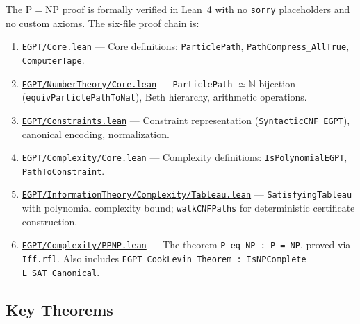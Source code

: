 \documentclass[11pt,a4paper]{article}
\begin{document}
The $\mathrm{P} = \mathrm{NP}$ proof is formally verified in Lean~4 with no \texttt{sorry} placeholders and no custom axioms. The six-file proof chain is:

\begin{enumerate}
    \item \href{https://eabadir.github.io/EGPT/Lean/EGPT/Core.lean}{\texttt{EGPT/Core.lean}} --- Core definitions: \texttt{ParticlePath}, \texttt{PathCompress\_AllTrue}, \texttt{ComputerTape}.
    \item \href{https://eabadir.github.io/EGPT/Lean/EGPT/NumberTheory/Core.lean}{\texttt{EGPT/NumberTheory/Core.lean}} --- \texttt{ParticlePath} $\simeq \mathbb{N}$ bijection (\texttt{equivParticlePathToNat}), Beth hierarchy, arithmetic operations.
    \item \href{https://eabadir.github.io/EGPT/Lean/EGPT/Constraints.lean}{\texttt{EGPT/Constraints.lean}} --- Constraint representation (\texttt{SyntacticCNF\_EGPT}), canonical encoding, normalization.
    \item \href{https://eabadir.github.io/EGPT/Lean/EGPT/Complexity/Core.lean}{\texttt{EGPT/Complexity/Core.lean}} --- Complexity definitions: \texttt{IsPolynomialEGPT}, \texttt{PathToConstraint}.
    \item \href{https://eabadir.github.io/EGPT/Lean/EGPT/InformationTheory/Complexity/Tableau.lean}{\texttt{EGPT/InformationTheory/Complexity/Tableau.lean}} --- \texttt{SatisfyingTableau} with polynomial complexity bound; \texttt{walkCNFPaths} for deterministic certificate construction.
    \item \href{https://eabadir.github.io/EGPT/Lean/EGPT/Complexity/PPNP.lean}{\texttt{EGPT/Complexity/PPNP.lean}} --- The theorem \texttt{P\_eq\_NP : P = NP}, proved via \texttt{Iff.rfl}. Also includes \texttt{EGPT\_CookLevin\_Theorem : IsNPComplete L\_SAT\_Canonical}.
\end{enumerate}

\subsection{Key Theorems}
\end{document}

